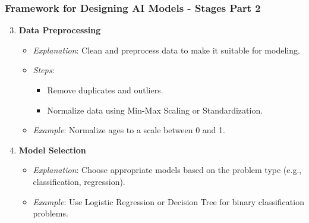 \documentclass[aspectratio=169]{beamer}
\begin{document}
\begin{frame}[fragile]
    \frametitle{Framework for Designing AI Models - Stages Part 2}
    \begin{enumerate}
        \setcounter{enumi}{2} %
        \item \textbf{Data Preprocessing}
        \begin{itemize}
            \item \textit{Explanation}: Clean and preprocess data to make it suitable for modeling. 
            \item \textit{Steps}:
            \begin{itemize}
                \item Remove duplicates and outliers.
                \item Normalize data using Min-Max Scaling or Standardization.
            \end{itemize}
            \item \textit{Example}: Normalize ages to a scale between 0 and 1.
        \end{itemize}

        \item \textbf{Model Selection}
        \begin{itemize}
            \item \textit{Explanation}: Choose appropriate models based on the problem type (e.g., classification, regression).
            \item \textit{Example}: Use Logistic Regression or Decision Tree for binary classification problems.
        \end{itemize}
    \end{enumerate}
\end{frame}
\end{document}
